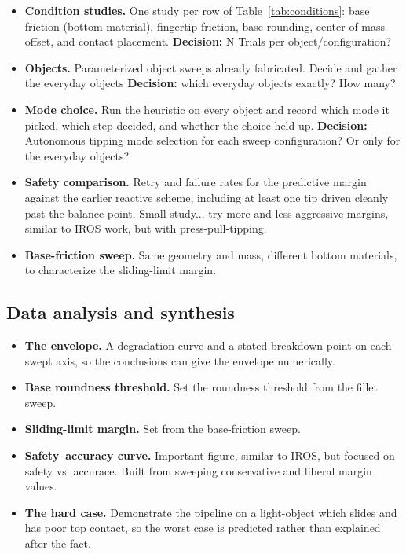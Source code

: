 \documentclass[10pt, conference]{IEEEtran}
\newcommand{\decision}[1]{\textcolor{red!80!black}{\textbf{Decision:} #1}}
\begin{document}
\begin{itemize}[leftmargin=*, itemsep=2pt]
  \item \textbf{Condition studies.} One study per row of Table~\ref{tab:conditions}: base friction (bottom material), fingertip friction, base rounding, center-of-mass offset, and contact placement. \decision{N Trials per object/configuration?}
  \item \textbf{Objects.} Parameterized object sweeps already fabricated. Decide and gather the everyday objects \decision{which everyday objects exactly? How many?}
  \item \textbf{Mode choice.} Run the heuristic on every object and record which mode it picked, which step decided, and whether the choice held up. \decision{Autonomous tipping mode selection for each sweep configuration? Or only for the everyday objects?}
  \item \textbf{Safety comparison.} Retry and failure rates for the predictive margin against the earlier reactive scheme, including at least one tip driven cleanly past the balance point. Small study... try more and less aggressive margins, similar to IROS work, but with press-pull-tipping.
  \item \textbf{Base-friction sweep.} Same geometry and mass, different bottom materials, to characterize the sliding-limit margin.
\end{itemize}

\subsection{Data analysis and synthesis}

\begin{itemize}[leftmargin=*, itemsep=2pt]
  \item \textbf{The envelope.} A degradation curve and a stated breakdown point on each swept axis, so the conclusions can give the envelope numerically.
  \item \textbf{Base roundness threshold.} Set the roundness threshold from the fillet sweep.
  \item \textbf{Sliding-limit margin.} Set from the base-friction sweep.
  \item \textbf{Safety--accuracy curve.} Important figure, similar to IROS, but focused on safety vs. accurace. Built from sweeping conservative and liberal margin values.
  \item \textbf{The hard case.} Demonstrate the pipeline on a light-object which slides and has poor top contact, so the worst case is predicted rather than explained after the fact.
\end{itemize}
\end{document}
